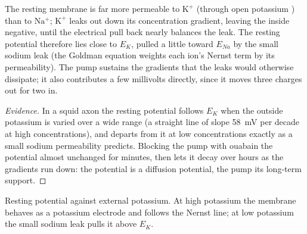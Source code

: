 \begin{proposition}\label{prop:b1:membranes-transport:resting}
The resting membrane is far more permeable to $\mathrm{K^+}$ (through
open potassium ) than to $\mathrm{Na^+}$; $\mathrm{K^+}$ leaks
out down its concentration gradient, leaving the inside negative, until
the electrical pull back nearly balances the leak. The resting
potential therefore lies close to $E_K$, pulled a little toward
$E_{Na}$ by the small sodium leak (the Goldman equation weights each
ion's Nernst term by its permeability). The pump sustains the
gradients that the leaks would otherwise dissipate; it also contributes
a few millivolts directly, since it moves three charges out for two in.
\end{proposition}
\begin{proof}[Evidence]
In a squid axon the resting potential follows $E_K$ when the outside
potassium is varied over a wide range (a straight line of slope
\qty{58}{mV} per decade at high concentrations), and departs from it
at low concentrations exactly as a small sodium permeability predicts.
Blocking the pump with ouabain  the potential almost unchanged
for minutes, then lets it decay over hours as the gradients run down:
the potential is a diffusion potential, the pump its long-term
support.
\end{proof}

\begin{omfigure}

{\small Resting potential against external potassium. At high
potassium the membrane behaves as a potassium electrode and follows the
Nernst line; at low potassium the small sodium leak pulls it above
$E_K$.}
\end{omfigure}


